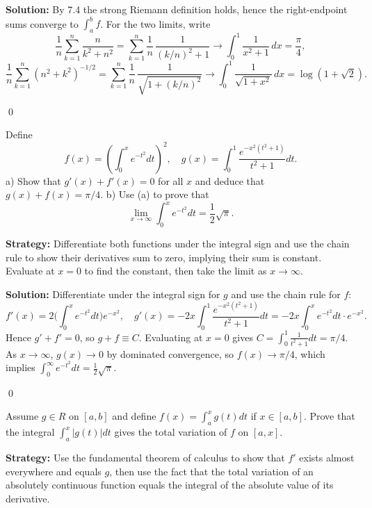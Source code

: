 \bigskip\noindent\textbf{Solution:}
By 7.4 the strong Riemann definition holds, hence the right-endpoint sums converge to $\int_a^b f$. For the two limits, write
\[\frac{1}{n}\sum_{k=1}^n \frac{n}{k^2+n^2}=\sum_{k=1}^n \frac{1}{n}\,\frac{1}{(k/n)^2+1}\to \int_0^1 \frac{1}{x^2+1}\,dx=\frac{\pi}{4},\]
\[\frac{1}{n}\sum_{k=1}^n (n^2+k^2)^{-1/2}=\sum_{k=1}^n \frac{1}{n}\,\frac{1}{\sqrt{1+(k/n)^2}}\to \int_0^1 \frac{1}{\sqrt{1+x^2}}\,dx=\log(1+\sqrt2).
\]




\qed
\begin{problembox}
Define 
\[f(x) = \left( \int_0^x e^{-t^2} dt \right)^2, \quad g(x) = \int_0^1 \frac{e^{-x^2(t^2+1)}}{t^2 + 1} dt.\]
a) Show that $g'(x) + f'(x) = 0$ for all $x$ and deduce that $g(x) + f(x) = \pi / 4$.
b) Use (a) to prove that 
\[\lim_{x \to \infty} \int_0^x e^{-t^2} dt = \frac{1}{2} \sqrt{\pi}.\]
\end{problembox}

\noindent\textbf{Strategy:} Differentiate both functions under the integral sign and use the chain rule to show their derivatives sum to zero, implying their sum is constant. Evaluate at $x = 0$ to find the constant, then take the limit as $x \to \infty$.

\bigskip\noindent\textbf{Solution:}
Differentiate under the integral sign for $g$ and use the chain rule for $f$:
\[f'(x)=2\Big(\int_0^x e^{-t^2}dt\Big)e^{-x^2},\quad g'(x)=-2x\int_0^1 \frac{e^{-x^2(t^2+1)}}{t^2+1}dt=-2x\int_0^x e^{-t^2}dt\cdot e^{-x^2}.
\]
Hence $g'+f'=0$, so $g+f\equiv C$. Evaluating at $x=0$ gives $C=\int_0^1\frac{1}{t^2+1}dt=\pi/4$. As $x\to\infty$, $g(x)\to0$ by dominated convergence, so $f(x)\to \pi/4$, which implies $\int_0^\infty e^{-t^2}dt=\tfrac12\sqrt\pi$.




\qed
\begin{problembox}
Assume $g \in R$ on $[a, b]$ and define $f(x) = \int_a^x g(t) dt$ if $x \in [a, b]$. Prove that the integral $\int_a^x |g(t)| dt$ gives the total variation of $f$ on $[a, x]$.
\end{problembox}

\noindent\textbf{Strategy:} Use the fundamental theorem of calculus to show that $f'$ exists almost everywhere and equals $g$, then use the fact that the total variation of an absolutely continuous function equals the integral of the absolute value of its derivative.

